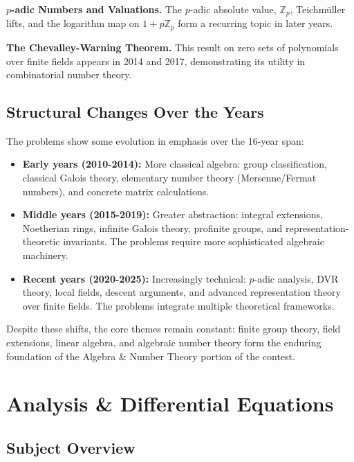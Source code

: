 \medskip
\noindent\textbf{$p$-adic Numbers and Valuations.} The $p$-adic absolute value, $\mathbb{Z}_p$, Teichm\"uller lifts, and the logarithm map on $1+p\mathbb{Z}_p$ form a recurring topic in later years.

\medskip
\noindent\textbf{The Chevalley-Warning Theorem.} This result on zero sets of polynomials over finite fields appears in 2014 and 2017, demonstrating its utility in combinatorial number theory.

\subsection{Structural Changes Over the Years}

The problems show some evolution in emphasis over the 16-year span:

\begin{itemize}
    \item \textbf{Early years (2010-2014):} More classical algebra: group classification, classical Galois theory, elementary number theory (Mersenne/Fermat numbers), and concrete matrix calculations.

    \item \textbf{Middle years (2015-2019):} Greater abstraction: integral extensions, Noetherian rings, infinite Galois theory, profinite groups, and representation-theoretic invariants. The problems require more sophisticated algebraic machinery.

    \item \textbf{Recent years (2020-2025):} Increasingly technical: $p$-adic analysis, DVR theory, local fields, descent arguments, and advanced representation theory over finite fields. The problems integrate multiple theoretical frameworks.
\end{itemize}

Despite these shifts, the core themes remain constant: finite group theory, field extensions, linear algebra, and algebraic number theory form the enduring foundation of the Algebra \& Number Theory portion of the contest.

\section{Analysis \& Differential Equations}
\label{sec:analysis}

\subsection{Subject Overview}

